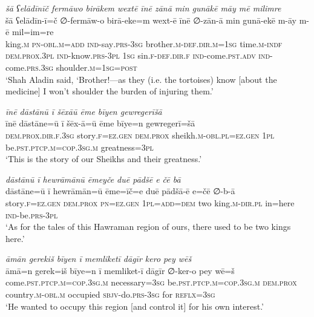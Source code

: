 \ea \label{DG.67}
\textit{šā ʕelādīnīč fermāwo birākem wextē īnē zānā min gunākē māy mē milimre} \\ 
\gll šā ʕelādīn-ī=č ∅-fermāw-o birā-eke=m wext-ē īnē ∅-zān-ā min gunā-ekē m-āy m-ē mil=im=re \\ 
 king\textsc{.m} \textsc{pn}\textsc{-obl}\textsc{.m}\textsc{=add} \textsc{ind-}say\textsc{.prs}\textsc{-3sg} brother\textsc{.m}\textsc{-def}\textsc{.dir}\textsc{.m}\textsc{=1sg} time\textsc{.m}\textsc{-indf} \textsc{dem.prox}\textsc{.3pl} \textsc{ind-}know\textsc{.prs}\textsc{-3pl} \textsc{1sg} sin\textsc{\textsc{.f}}\textsc{-def}\textsc{.dir}\textsc{\textsc{.f}} \textsc{ind-}come\textsc{.pst}\textsc{.adv} \textsc{ind-}come\textsc{.prs}\textsc{.3sg} shoulder\textsc{.m}\textsc{=1sg}\textsc{=\textsc{post}} \\ 
\glt `Shah Aladin said, ‘Brother!—as they (i.e. the tortoises) know [about the medicine] I won’t shoulder the burden of injuring them.'
\z 
 
\ea \label{DG.73}
\textit{īnē dāstānū ī šēxāū ēme bīyen gewregerīšā} \\ 
\gll īnē dāstāne=ū ī šēx-ā=ū ēme bīye=n gewregerī=šā \\ 
 \textsc{dem.prox}\textsc{.dir}\textsc{\textsc{.f}}\textsc{.3sg} story\textsc{\textsc{.f}}\textsc{=ez}\textsc{.gen} \textsc{dem.prox} sheikh\textsc{.m}\textsc{-obl}\textsc{.pl}=\textsc{ez.gen} \textsc{1pl} be\textsc{.pst}\textsc{.ptcp}\textsc{.m}\textsc{=cop}\textsc{.3sg}\textsc{.m} greatness\textsc{=3pl} \\ 
\glt `This is the story of our Sheikhs and their greatness.'
\z 
 

\ea \label{DP.1}
\textit{dāstānū ī hewrāmānū ēmeyče duē pādšē e čē bā} \\ 
\gll dāstāne=ū ī hewrāmān=ū ēme=īč=e duē pādšā-ē e=čē ∅-b-ā \\ 
 story\textsc{\textsc{.f}}\textsc{=ez}\textsc{.gen} \textsc{dem.prox} \textsc{pn}\textsc{=ez}\textsc{.gen} \textsc{1pl}\textsc{=add}\textsc{=dem} two king\textsc{.m}\textsc{-dir}\textsc{.pl} in=here \textsc{ind-}be\textsc{.prs}\textsc{-3pl} \\ 
\glt `As for the tales of this Hawraman region of ours, there used to be two kings here.'
\z 
 
\ea \label{DP.5}
\textit{āmān gerekiš bīyen ī memliketī dāgīr kero pey wēš} \\ 
\gll āmā=n gerek=iš bīye=n ī memliket-ī dāgīr ∅-ker-o pey wē=š \\ 
 come\textsc{.pst}\textsc{.ptcp}\textsc{.m}\textsc{=cop}\textsc{.3sg}\textsc{.m} necessary\textsc{=3sg} be\textsc{.pst}\textsc{.ptcp}\textsc{.m}\textsc{=cop}\textsc{.3sg}\textsc{.m} \textsc{dem.prox} country\textsc{.m}\textsc{-obl}\textsc{.m} occupied \textsc{sbjv-}do\textsc{.prs}\textsc{-3sg} for \textsc{reflx}\textsc{=3sg} \\ 
\glt `He wanted to occupy this region [and control it] for his own interest.'
\z 
 
